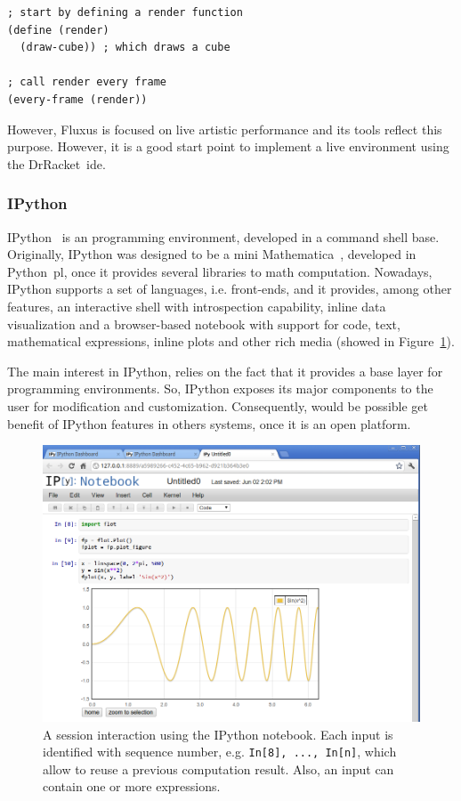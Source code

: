 \lstset{style=scheme}
\begin{lstlisting}
; start by defining a render function
(define (render)
  (draw-cube)) ; which draws a cube
  
; call render every frame
(every-frame (render))
\end{lstlisting}

However, Fluxus is focused on live artistic performance and its tools reflect this purpose. However, it is a good start point to implement a live environment using the DrRacket~\ac{ide}. 

\subsubsection{IPython}

IPython~\cite{PER-GRA:2007} is an programming environment, developed in a command shell base. Originally, IPython was designed to be a mini Mathematica~\cite{wolfram1991mathematica}, developed in Python~\ac{pl}, once it provides several libraries to math computation. Nowadays, IPython supports a set of languages, i.e. front-ends, and it provides, among other features, an interactive shell with introspection capability, inline data visualization and a browser-based notebook with support for code, text, mathematical expressions, inline plots and other rich media (showed in Figure~\ref{fig:ipython}). 

The main interest in IPython, relies on the fact that it provides a base layer for programming environments. So, IPython exposes its major components to the user for modification and customization. Consequently, would be possible get benefit of IPython features in others systems, once it is an open platform.  

\begin{figure}[!htbp]
  \centering
  \includegraphics[scale=0.22]{img/ipython}
    \caption{A session interaction using the IPython notebook. Each input is identified with sequence number, e.g. {\tt In[8], ..., In[n]}, which allow to reuse a previous computation result. Also, an input can contain one or more expressions. }  
  \label{fig:ipython}
\end{figure}

